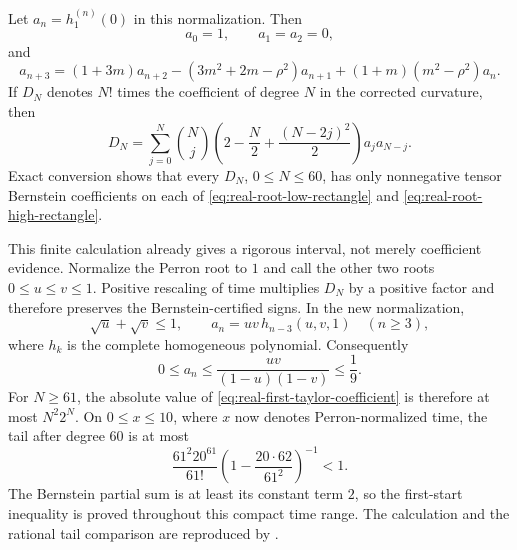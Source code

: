\documentclass[11pt]{article}
\theoremstyle{remark}
\begin{document}
Let $a_n=h_1^{(n)}(0)$ in this normalization.  Then
\[
 a_0=1,\qquad a_1=a_2=0,
\]
and
\begin{equation}\label{eq:real-first-derivative-recurrence}
 a_{n+3}=(1+3m)a_{n+2}-(3m^2+2m-\rho^2)a_{n+1}
 +(1+m)(m^2-\rho^2)a_n.
\end{equation}
If $D_N$ denotes $N!$ times the coefficient of degree $N$ in the corrected
curvature, then
\begin{equation}\label{eq:real-first-taylor-coefficient}
 D_N=\sum_{j=0}^N\binom Nj
 \left(2-\frac N2+\frac{(N-2j)^2}{2}\right)a_ja_{N-j}.
\end{equation}
Exact conversion shows that every $D_N$, $0\leq N\leq60$, has only
nonnegative tensor Bernstein coefficients on each of
\eqref{eq:real-root-low-rectangle} and
\eqref{eq:real-root-high-rectangle}.

This finite calculation already gives a rigorous interval, not merely
coefficient evidence.  Normalize the Perron root to $1$ and call the other
two roots $0\leq u\leq v\leq1$.  Positive rescaling of time multiplies
$D_N$ by a positive factor and therefore preserves the Bernstein-certified
signs.  In the new normalization,
\[
 \sqrt u+\sqrt v\leq1,
 \qquad
 a_n=uv\,h_{n-3}(u,v,1)\quad(n\geq3),
\]
where $h_k$ is the complete homogeneous polynomial.  Consequently
\[
 0\leq a_n\leq\frac{uv}{(1-u)(1-v)}\leq\frac19.
\]
For $N\geq61$, the absolute value of
\eqref{eq:real-first-taylor-coefficient} is therefore at most $N^2 2^N$.
On $0\leq x\leq10$, where $x$ now denotes Perron-normalized time, the tail
after degree $60$ is at most
\[
 \frac{61^2 20^{61}}{61!}
 \left(1-\frac{20\cdot62}{61^2}\right)^{-1}<1.
\]
The Bernstein partial sum is at least its constant term $2$, so the
first-start inequality is proved throughout this compact time range.  The
calculation and the rational tail comparison are reproduced by
.
\end{document}
